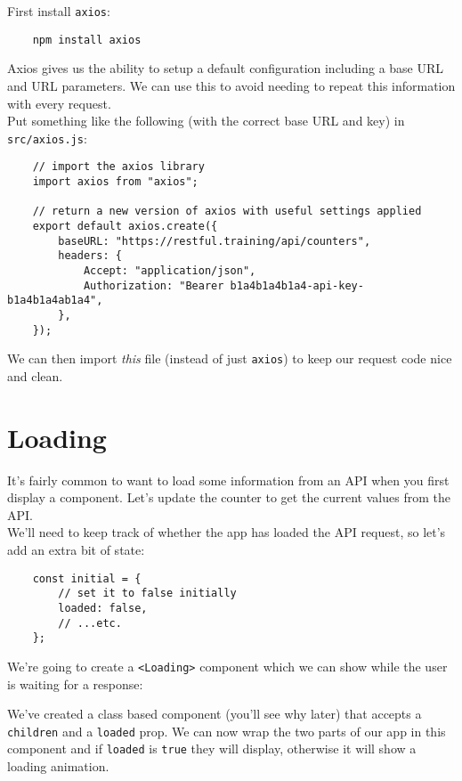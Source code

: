 First install \texttt{axios}:

\begin{verbatim}
    npm install axios
\end{verbatim}

Axios gives us the ability to setup a default configuration including a base URL and URL parameters. We can use this to avoid needing to repeat this information with every request.
\\

Put something like the following (with the correct base URL and key) in \texttt{src/axios.js}:

\begin{verbatim}
    // import the axios library
    import axios from "axios";

    // return a new version of axios with useful settings applied
    export default axios.create({
        baseURL: "https://restful.training/api/counters",
        headers: {
            Accept: "application/json",
            Authorization: "Bearer b1a4b1a4b1a4-api-key-b1a4b1a4ab1a4",
        },
    });
\end{verbatim}

We can then import \textit{this} file (instead of just \texttt{axios}) to keep our request code nice and clean.


\section{Loading}

It's fairly common to want to load some information from an API when you first display a component. Let's update the counter to get the current values from the API.
\\

We'll need to keep track of whether the app has loaded the API request, so let's add an extra bit of state:

\begin{verbatim}
    const initial = {
        // set it to false initially
        loaded: false,
        // ...etc.
    };
\end{verbatim}


We're going to create a \texttt{<Loading>} component which we can show while the user is waiting for a response:


We've created a class based component (you'll see why later) that accepts a \texttt{children} and a \texttt{loaded} prop. We can now wrap the two parts of our app in this component and if \texttt{loaded} is \texttt{true} they will display, otherwise it will show a loading animation.
\\

